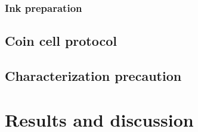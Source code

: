 \documentclass{article}
\begin{document}
\subsubsection{Ink preparation}

\subsection{Coin cell protocol}

\subsection{Characterization precaution}


\section{Results and discussion}
\end{document}
